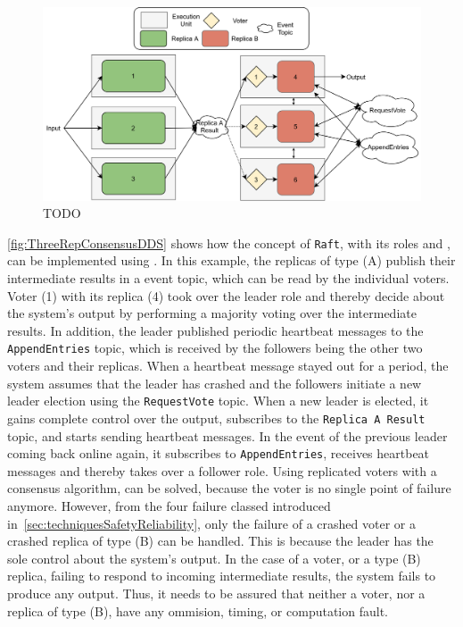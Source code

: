 \begin{figure}[!hb]
	\centering
	\includegraphics[width=0.75\linewidth]{images/ThreeComponentConsensusDDS}
	\caption{TODO}
	\label{fig:ThreeRepConsensusDDS}
\end{figure}

\autoref{fig:ThreeRepConsensusDDS} shows how the concept of \texttt{Raft}, with its roles and , can be implemented using .
In this example, the replicas of type (A) publish their intermediate results in a  event topic, which can be read by the individual voters.
Voter (1) with its replica (4) took over the leader role and thereby decide about the system's output by performing a majority voting over the intermediate results.
In addition, the leader published periodic heartbeat messages to the \texttt{AppendEntries} topic, which is received by the followers being the other two voters and their replicas.
When a heartbeat message stayed out for a period, the system assumes that the leader has crashed and the followers initiate a new leader election using the \texttt{RequestVote} topic.
When a new leader is elected, it gains complete control over the output, subscribes to the \texttt{Replica A Result} topic, and starts sending heartbeat messages.
In the event of the previous leader coming back online again, it subscribes to \texttt{AppendEntries}, receives heartbeat messages and thereby takes over a follower role.
Using replicated voters with a consensus algorithm, \ChallengeVoter can be solved, because the voter is no single point of failure anymore.
However, from the four failure classed introduced in~\autoref{sec:techniquesSafetyReliability}, only the failure of a crashed voter or a crashed replica of type (B) can be handled.
This is because the leader has the sole control about the system's output.
In the case of a voter, or a type (B) replica, failing to respond to incoming intermediate results, the system fails to produce any output.
Thus, it needs to be assured that neither a voter, nor a replica of type (B), have any ommision, timing, or computation fault.


